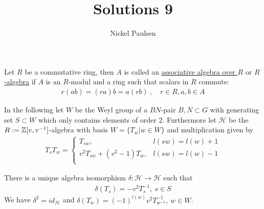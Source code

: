 \documentclass[]{article}
\title{Solutions 9}
\author{Nickel Paulsen}
\begin{document}
\maketitle

\begin{definition*}
   Let \(R\) be a commutative ring, then \(A\) is called an \underline{associative algebra over \(R\)} or \underline{\(R\)-algebra} if \(A\) is an \(R\)-modul and a ring 
   such that scalars in \(R\) commute:
   \begin{align*}
     r ( a b) = (r a) b = a(rb) \ , \quad r \in R, a,b \in A
   \end{align*}
\end{definition*}

In the following let \(W\) be the Weyl group of a \(BN\)-pair \(B,N \subset G\) with generating set \(S \subset W\) which only contains elements
of order \(2\). Furthermore let \(\mathscr{H}\) be the \(R:={\mathbb{Z}}[v,v^{-1}]\)-algebra with basis \(W=\{T_w | w \in W\}\) and multiplication given by
\begin{align*}
    T_s T_w = \begin{cases}
        T_{sw}, & l(sw)=l(w)+1 \\
        v^2 T_{sw} + (v^2-1) T_w, & l(sw)= l(w)-1 \\
    \end{cases}
\end{align*}

\setcounter{exercise}{4}
\begin{exercise}
There is a unique algebra isomorphism \(\delta: \mathscr{H} \rightarrow \mathscr{H}\) such that
\begin{align*}
    \delta(T_s) = - v^2  T_s^{-1}, \ s \in S
\end{align*}
We have \(\delta^2 = id_\mathscr{H}\) and \(\delta(T_w)=(-1)^{l(w)}v^2 T_{w^{-1}}^{-1}, \ w \in W\).
\end{exercise}
\end{document}
